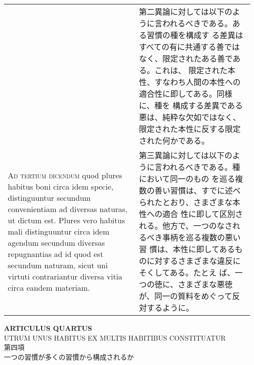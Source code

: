 \documentclass[10pt]{jsarticle} %
\begin{document}
\begin{longtable}{p{21em}p{21em}}
&

第二異論に対しては以下のように言われるべきである。ある習慣の種を構成す
る差異はすべての有に共通する善ではなく、限定されたある善である。これは、
限定された本性、すなわち人間の本性への適合性に即してある。同様に、種を
構成する差異である悪は、純粋な欠如ではなく、限定された本性に反する限定
された何かである。

\\



{\scshape Ad tertium dicendum} quod plures habitus boni circa idem
specie, distinguuntur secundum convenientiam ad diversas naturas, ut
dictum est. Plures vero habitus mali distinguuntur circa idem agendum
secundum diversas repugnantias ad id quod est secundum naturam, sicut
uni virtuti contrariantur diversa vitia circa eandem materiam.

&

第三異論に対しては以下のように言われるべきである。種において同一のもの
を巡る複数の善い習慣は、すでに述べられたとおり、さまざまな本性への適合
性に即して区別される。他方で、一つのなされるべき事柄を巡る複数の悪い習
慣は、本性に即してあるものに対するさまざまな違反にそくしてある。たとえ
ば、一つの徳に、さまざまな悪徳が、同一の質料をめぐって反対するように。

\\


\end{longtable}
\newpage





\begin{center}
{\Large {\bf ARTICULUS QUARTUS}}\\
{\large UTRUM UNUS HABITUS EX MULTIS HABITIBUS CONSTITUATUR}\\
{\Large 第四項\\一つの習慣が多くの習慣から構成されるか}
\end{center}
\end{document}

